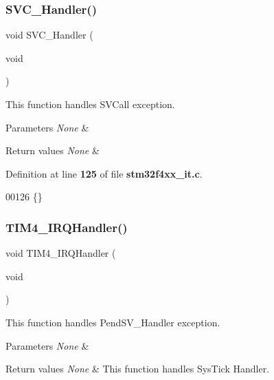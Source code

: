 \subsubsection{S\+V\+C\+\_\+\+Handler()}
{\footnotesize\ttfamily void S\+V\+C\+\_\+\+Handler (\begin{DoxyParamCaption}\item[{void}]{ }\end{DoxyParamCaption})}



This function handles S\+V\+Call exception. 


\begin{DoxyParams}{Parameters}
{\em None} & \\
\hline
\end{DoxyParams}

\begin{DoxyRetVals}{Return values}
{\em None} & \\
\hline
\end{DoxyRetVals}


Definition at line \textbf{ 125} of file \textbf{ stm32f4xx\+\_\+it.\+c}.


\begin{DoxyCode}
00126 \{\}
\end{DoxyCode}
\mbox{\label{group__TIM__PWM__Input_ga7133f3f78767503641d307386e68bd28}} 
\subsubsection{T\+I\+M4\+\_\+\+I\+R\+Q\+Handler()}
{\footnotesize\ttfamily void T\+I\+M4\+\_\+\+I\+R\+Q\+Handler (\begin{DoxyParamCaption}\item[{void}]{ }\end{DoxyParamCaption})}



This function handles Pend\+S\+V\+\_\+\+Handler exception. 


\begin{DoxyParams}{Parameters}
{\em None} & \\
\hline
\end{DoxyParams}

\begin{DoxyRetVals}{Return values}
{\em None} & This function handles Sys\+Tick Handler. \\
\hline
\end{DoxyRetVals}

